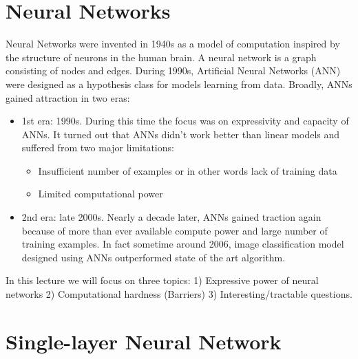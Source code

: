 \documentclass[12pt]{report}
\begin{document}

\renewcommand{\bibname}{References}

\maketitle

\vspace*{.1in}



\section{Neural Networks}

Neural Networks were invented in 1940s as a model of computation inspired by the structure of neurons in the human brain. A neural network is a graph consisting of nodes and edges. During 1990s, Artificial Neural Networks (ANN) were designed as a hypothesis class for models learning from data. Broadly, ANNs gained attraction in two eras:
\begin{itemize}
\item 1st era: 1990s. During this time the focus was on expressivity and capacity of ANNs. It turned out that ANNs didn't work better than linear models and suffered from two major limitations:
\begin{itemize}
	\item Insufficient number of examples or in other words lack of training data
	\item Limited computational power
\end{itemize}
\item 2nd era: late 2000s. Nearly a decade later, ANNs gained traction again because of more than ever available compute power and large number of training examples. In fact sometime around 2006, image classification model designed using ANNs outperformed state of the art algorithm.
\end{itemize}

In this lecture we will focus on three topics: 1) Expressive power of neural networks 2) Computational hardness (Barriers) 3) Interesting/tractable questions.

\section{Single-layer Neural Network}
 
\end{document}
